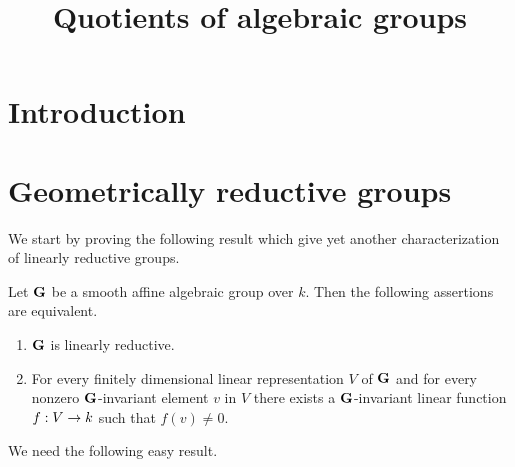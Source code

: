 



\title{Quotients of algebraic groups}
\date{}
\maketitle

\section{Introduction}
\noindent


\section{Geometrically reductive groups}
\noindent
We start by proving the following result which give yet another characterization of linearly reductive groups.

\begin{theorem}\label{theorem:characterization_of_linearly_reductive_groups_in_terms_of_existence_of_invariant_linear_forms}
Let $\mathbf{G}$ be a smooth affine algebraic group over $k$. Then the following assertions are equivalent.
\begin{enumerate}[label=\emph{\textbf{(\roman*)}}, leftmargin=3.0em]
\item $\mathbf{G}$ is linearly reductive.
\item For every finitely dimensional linear representation $V$ of $\mathbf{G}$ and for every nonzero $\mathbf{G}$-invariant element $v$ in $V$ there exists a $\mathbf{G}$-invariant linear function $f:V\rightarrow k$ such that $f(v)\neq 0$. 
\end{enumerate}
\end{theorem}
\noindent
We need the following easy result.

